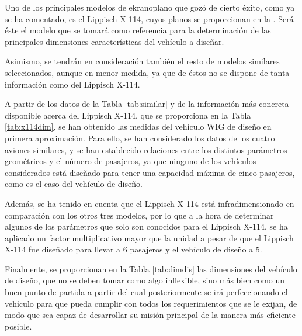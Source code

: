 Uno de los principales modelos de ekranoplano que gozó de cierto éxito, como ya se ha comentado, es el Lippisch X-114, cuyos planos se proporcionan en la . Será éste el modelo que se tomará como referencia para la determinación de las principales dimensiones características del vehículo a diseñar.

Asimismo, se tendrán en consideración también el resto de modelos similares seleccionados, aunque en menor medida, ya que de éstos no se dispone de tanta información como del Lippisch X-114.

A partir de los datos de la Tabla \ref{tab:similar} y de la información más concreta disponible acerca del Lippisch X-114, que se proporciona en la Tabla \ref{tab:x114dim}, se han obtenido las medidas del vehículo WIG de diseño en primera aproximación. Para ello, se han considerado los datos de los cuatro aviones similares, y se han establecido relaciones entre los distintos parámetros geométricos y el número de pasajeros, ya que ninguno de los vehículos considerados está diseñado para tener una capacidad máxima de cinco pasajeros, como es el caso del vehículo de diseño.

Además, se ha tenido en cuenta que el Lippisch X-114 está infradimensionado en comparación con los otros tres modelos, por lo que a la hora de determinar algunos de los parámetros que solo son conocidos para el Lippisch X-114, se ha aplicado un factor multiplicativo mayor que la unidad a pesar de que el Lippisch X-114 fue diseñado para llevar a 6 pasajeros y el vehículo de diseño a 5.

Finalmente, se proporcionan en la Tabla \ref{tab:dimdis} las dimensiones del vehículo de diseño, que no se deben tomar como algo inflexible, sino más bien como un buen punto de partida a partir del cual posteriormente se irá perfeccionando el vehículo para que pueda cumplir con todos los requerimientos que se le exijan, de modo que sea capaz de desarrollar su misión principal de la manera más eficiente posible.

